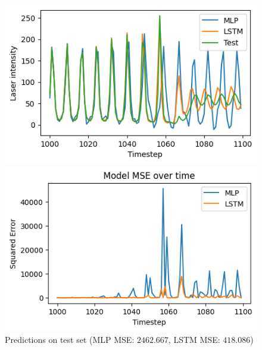\begin{figure}[h!]
    \begin{minipage}[t]{0.48\textwidth}
        \includegraphics[width=\textwidth]{figures/time-series-santa-fe-results-mlp-lstm.png}
    \end{minipage}
    \hfill
    \begin{minipage}[t]{0.48\textwidth}
        \includegraphics[width=\textwidth]{figures/time-series-santa-fe-errors-mlp-lstm.png}
    \end{minipage}
    \caption{Predictions on test set (MLP MSE: $2462.667$, LSTM MSE: $418.086$)}
    \label{fig:time-series-santa-fe-results-mlp-lstm}
\end{figure}
